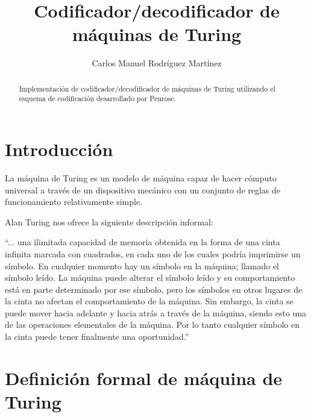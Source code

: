 \documentclass[10pt,a4paper]{article}
\author{Carlos Manuel Rodríguez Martínez}
\title{Codificador/decodificador de máquinas de Turing}
\begin{document}
\maketitle

\begin{abstract}
   Implementación de codificador/decodificador de máquinas de Turing utilizando el esquema de codificación desarrollado por Penrose.
\end{abstract}

\newpage

\tableofcontents

\newpage

\section{Introducción}
La máquina de Turing es un modelo de máquina capaz de hacer cómputo universal a través de un dispositivo mecánico con un conjunto de reglas de funcionamiento relativamente simple.

Alan Turing nos ofrece la siguiente descripción informal:

\vspace{0.5cm}
``... una ilimitada capacidad de memoria obtenida en la forma de una cinta infinita marcada con cuadrados, en cada uno de los cuales podría imprimirse un símbolo. En cualquier momento hay un símbolo en la máquina; llamado el símbolo leído. La máquina puede alterar el símbolo leído y su comportamiento está en parte determinado por ese símbolo, pero los símbolos en otros lugares de la cinta no afectan el comportamiento de la máquina. Sin embargo, la cinta se puede mover hacia adelante y hacia atrás a través de la máquina, siendo esto una de las operaciones elementales de la máquina. Por lo tanto cualquier símbolo en la cinta puede tener finalmente una oportunidad.''
\vspace{0.5cm}


\section{Definición formal de máquina de Turing}
\end{document}
